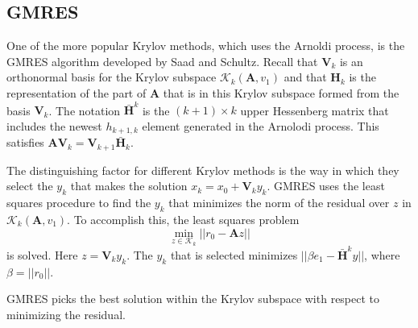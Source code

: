 \documentclass[12pt]{article}
\newcommand{\ve}[1]{\ensuremath{\mathbf{#1}}}
\begin{document}
%

\subsection*{GMRES}
One of the more popular Krylov methods, which uses the Arnoldi process, is the GMRES algorithm developed by Saad and Schultz. %
Recall that $\ve{V}_{k}$ is an orthonormal basis for the Krylov subspace $\mathcal{K}_{k}(\ve{A}, v_1)$ and that $\ve{H}_{k}$ is the representation of the part of $\ve{A}$ that is in this Krylov subspace formed from the basis $\ve{V}_{k}$. The notation $\bar{\ve{H}}^{k}$ is the $(k+1) \times k$ upper Hessenberg matrix that includes the newest $h_{k+1,k}$ element generated in the Arnolodi process. This satisfies $\ve{AV}_{k} = \ve{V}_{k+1}\bar{\ve{H}}_{k}$.%

The distinguishing factor for different Krylov methods is the way in which they select the $y_k$ that makes the solution $x_k = x_0 + \ve{V}_k y_k$. GMRES uses the least squares procedure to find the $y_k$ that minimizes the norm of the residual over $z$ in $\mathcal{K}_{k}(\ve{A}, v_1)$. To accomplish this, the least squares problem
%
\begin{equation}
  \min_{z \in \mathcal{K}_{k}} ||r_{0} - \ve{A}z||
  \label{eq:least-squares}
\end{equation} 
%
is solved. Here $z = \ve{V}_k y_k$. The $y_{k}$ that is selected minimizes $||\beta e_{1} - \bar{\ve{H}}^{k} y||$, where $\beta = ||r_{0}||$.%

GMRES picks the best solution within the Krylov subspace with respect to minimizing the residual. %
\end{document}

